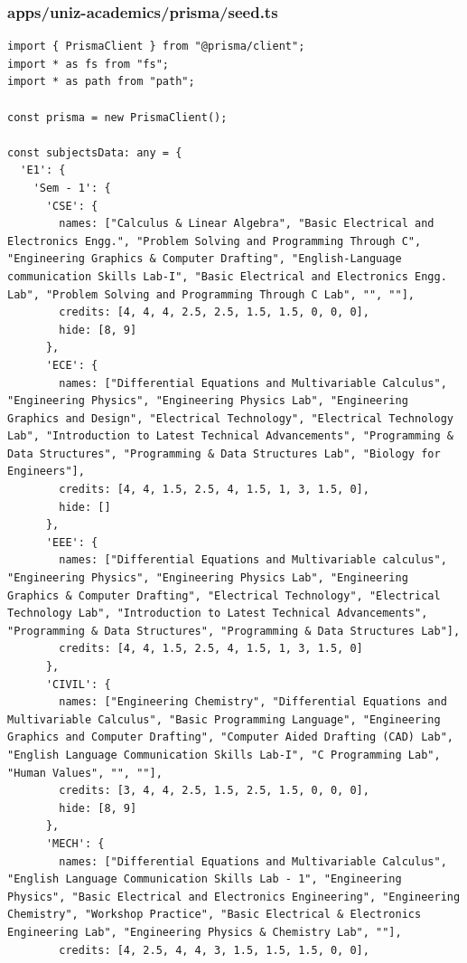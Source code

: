 \documentclass[11pt,a4paper,oneside]{article}
\begin{document}
\subsubsection*{apps/uniz-academics/prisma/seed.ts}
\begin{lstlisting}
import { PrismaClient } from "@prisma/client";
import * as fs from "fs";
import * as path from "path";

const prisma = new PrismaClient();

const subjectsData: any = {
  'E1': {
    'Sem - 1': {
      'CSE': {
        names: ["Calculus & Linear Algebra", "Basic Electrical and Electronics Engg.", "Problem Solving and Programming Through C", "Engineering Graphics & Computer Drafting", "English-Language communication Skills Lab-I", "Basic Electrical and Electronics Engg. Lab", "Problem Solving and Programming Through C Lab", "", ""],
        credits: [4, 4, 4, 2.5, 2.5, 1.5, 1.5, 0, 0, 0],
        hide: [8, 9]
      },
      'ECE': {
        names: ["Differential Equations and Multivariable Calculus", "Engineering Physics", "Engineering Physics Lab", "Engineering Graphics and Design", "Electrical Technology", "Electrical Technology Lab", "Introduction to Latest Technical Advancements", "Programming & Data Structures", "Programming & Data Structures Lab", "Biology for Engineers"],
        credits: [4, 4, 1.5, 2.5, 4, 1.5, 1, 3, 1.5, 0],
        hide: []
      },
      'EEE': {
        names: ["Differential Equations and Multivariable calculus", "Engineering Physics", "Engineering Physics Lab", "Engineering Graphics & Computer Drafting", "Electrical Technology", "Electrical Technology Lab", "Introduction to Latest Technical Advancements", "Programming & Data Structures", "Programming & Data Structures Lab"],
        credits: [4, 4, 1.5, 2.5, 4, 1.5, 1, 3, 1.5, 0]
      },
      'CIVIL': {
        names: ["Engineering Chemistry", "Differential Equations and Multivariable Calculus", "Basic Programming Language", "Engineering Graphics and Computer Drafting", "Computer Aided Drafting (CAD) Lab", "English Language Communication Skills Lab-I", "C Programming Lab", "Human Values", "", ""],
        credits: [3, 4, 4, 2.5, 1.5, 2.5, 1.5, 0, 0, 0],
        hide: [8, 9]
      },
      'MECH': {
        names: ["Differential Equations and Multivariable Calculus", "English Language Communication Skills Lab - 1", "Engineering Physics", "Basic Electrical and Electronics Engineering", "Engineering Chemistry", "Workshop Practice", "Basic Electrical & Electronics Engineering Lab", "Engineering Physics & Chemistry Lab", ""],
        credits: [4, 2.5, 4, 4, 3, 1.5, 1.5, 1.5, 0, 0],

\end{lstlisting}
\end{document}
